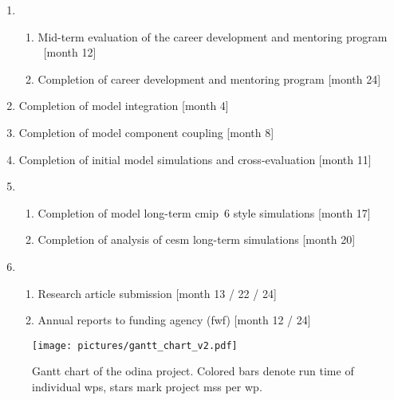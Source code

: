 \begin{enumerate}[start=0,label={MS\arabic*}]
  \itemsep0pt
  \item
  \begin{enumerate}[a]
  \item Mid-term evaluation of the career development and mentoring program \ \hfill [month 12]
  \item Completion of career development and mentoring program \hfill [month 24]
  \end{enumerate}
\item \quad Completion of model integration \hfill [month 4]
\item \quad Completion of model component coupling \hfill [month 8]
\item \quad Completion of initial model simulations and cross-evaluation \hfill [month 11]
\item 
\begin{enumerate}[a]
    \item Completion of model long-term \gls{cmip}~6 style simulations \hfill [month 17]
    \item Completion of analysis of \gls{cesm} long-term simulations \hfill [month 20]
\end{enumerate}
\item 
  \begin{enumerate}[a]
  \item Research article submission \hfill [month 13 / 22 / 24]
  \item Annual reports to funding agency (\gls{fwf}) \hfill [month 12 / 24]
  \end{enumerate}
\end{enumerate}

\begin{figure}[!ht]
  \centering
  \texttt{[image: pictures/gantt\_chart\_v2.pdf]}
  \caption{Gantt chart of the \gls{odina} project. Colored bars denote run time of individual \glspl{wp}, stars mark project \glspl{ms} per \gls{wp}.}
  \label{fig:ganttchart}%
\end{figure}

